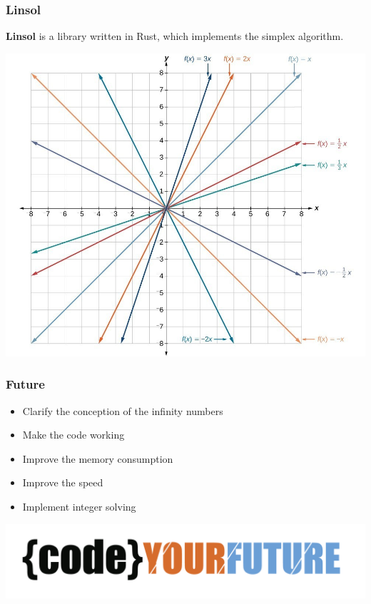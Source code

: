 \documentclass[12pt]{beamer}
\begin{document}
	\begin{frame}
		\frametitle{Linsol}
		\textbf{Linsol} is a library written in Rust, which implements the simplex algorithm.\\
		\begin{center}
			\includegraphics[scale=0.2]{graphs}
		\end{center}
	\end{frame}

	\begin{frame}
		\frametitle{Future}
		\begin{itemize}
			\item Clarify the conception of the infinity numbers
			\item Make the code working
			\item Improve the memory consumption
			\item Improve the speed
			\item Implement integer solving
		\end{itemize}
		\begin{center}
			\includegraphics[scale=0.15]{CodeYourFuture}
		\end{center}
		\vspace{-1cm}
	\end{frame}
\end{document}
